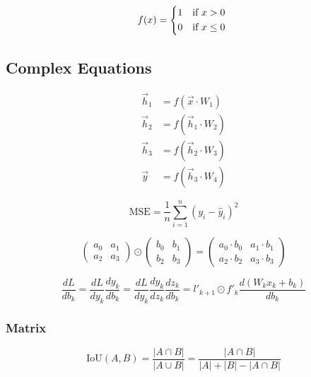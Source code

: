 \documentclass{article} %
\begin{document}
\begin{equation}
    f(x) =
    \begin{cases*}
        1 & if $x > 0$\\
        0 & if $x \leq 0$
     \end{cases*}
\end{equation}

\subsection{Complex Equations}

\begin{align}
    \vec{h}_1 &= f(\vec{x} \cdot W_1) \label{eq:layers1} \\
    \vec{h}_2 &= f(\vec{h}_1 \cdot W_2) \\
    \vec{h}_3 &= f(\vec{h}_2 \cdot W_3) \\
    \vec{y} &= f(\vec{h}_3 \cdot W_4)
\end{align}

\begin{equation}\label{eq:mse}
    \text{MSE} = \frac{1}{n} \sum_{i=1}^{n}(y_{i} - \hat{y}_{i})^2
\end{equation}

\[
\begin{pmatrix} a_0 & a_1\\ a_2 & a_3 \end{pmatrix}
\odot
\begin{pmatrix} b_0 & b_1\\ b_2 & b_3 \end{pmatrix}
=
\begin{pmatrix} a_0 \cdot b_0 & a_1 \cdot b_1\\ a_2 \cdot b_2 & a_3 \cdot b_3 \end{pmatrix}
\]

\[
\frac{dL}{db_k} = \frac{dL}{dy_k} \frac{dy_k}{db_k} = \frac{dL}{dy_k} \frac{dy_k}{dz_k} \frac{dz_k}{db_k} = l'_{k+1} \odot f'_k \frac{d(W_k x_k + b_k)}{db_k}
\]

\subsubsection{Matrix}

\begin{equation}
    \text{IoU}(A,B) = \frac{|A \cap B|}{|A \cup B|} = \frac{|A \cap B|}{|A| + |B| - |A \cap B|}
\end{equation}

\clearpage
\end{document}
